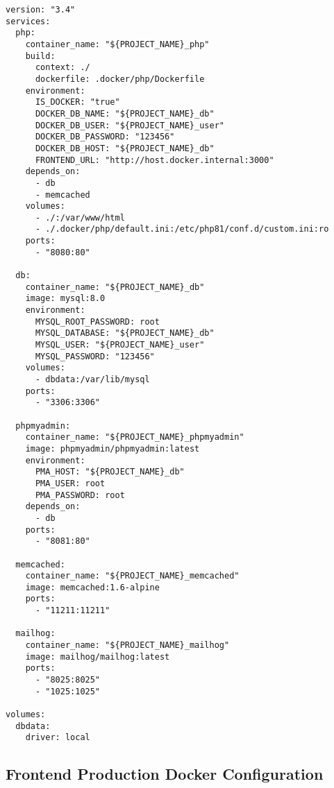 \begin{lstlisting}[caption={Backend Development Docker Architecture}, captionpos=b, breaklines=true]
version: "3.4"
services:
  php:
    container_name: "${PROJECT_NAME}_php"
    build:
      context: ./
      dockerfile: .docker/php/Dockerfile
    environment:
      IS_DOCKER: "true"
      DOCKER_DB_NAME: "${PROJECT_NAME}_db"
      DOCKER_DB_USER: "${PROJECT_NAME}_user"
      DOCKER_DB_PASSWORD: "123456"
      DOCKER_DB_HOST: "${PROJECT_NAME}_db"
      FRONTEND_URL: "http://host.docker.internal:3000"
    depends_on:
      - db
      - memcached
    volumes:
      - ./:/var/www/html
      - ./.docker/php/default.ini:/etc/php81/conf.d/custom.ini:ro
    ports:
      - "8080:80"

  db:
    container_name: "${PROJECT_NAME}_db"
    image: mysql:8.0
    environment:
      MYSQL_ROOT_PASSWORD: root
      MYSQL_DATABASE: "${PROJECT_NAME}_db"
      MYSQL_USER: "${PROJECT_NAME}_user"
      MYSQL_PASSWORD: "123456"
    volumes:
      - dbdata:/var/lib/mysql
    ports:
      - "3306:3306"

  phpmyadmin:
    container_name: "${PROJECT_NAME}_phpmyadmin"
    image: phpmyadmin/phpmyadmin:latest
    environment:
      PMA_HOST: "${PROJECT_NAME}_db"
      PMA_USER: root
      PMA_PASSWORD: root
    depends_on:
      - db
    ports:
      - "8081:80"

  memcached:
    container_name: "${PROJECT_NAME}_memcached"
    image: memcached:1.6-alpine
    ports:
      - "11211:11211"

  mailhog:
    container_name: "${PROJECT_NAME}_mailhog"
    image: mailhog/mailhog:latest
    ports:
      - "8025:8025"
      - "1025:1025"

volumes:
  dbdata:
    driver: local
\end{lstlisting}

\subsection{Frontend Production Docker Configuration}
\label{appendix:frontend_docker_prod}


